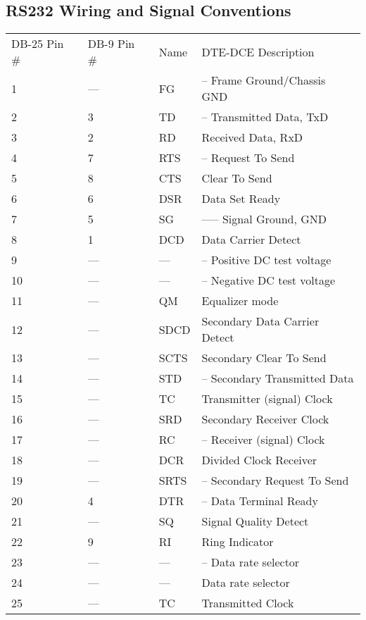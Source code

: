 \label{RS232-Wiring-and-Signal-Conventions}

\subsection*{RS232 Wiring and Signal Conventions}

\label{index-Cables-216}

\begin{longtable}{llll}
{DB-25 Pin \#} & {DB-9 Pin \#} & {Name} & {DTE-DCE Description 
 } \\
{1} & {{---}} & {FG} & {{--} Frame Ground/Chassis GND 
 } \\
{2} & {3} & {TD} & {{--}\gt{} Transmitted Data, TxD 
 } \\
{3} & {2} & {RD} & {\lt{}{--} Received Data, RxD 
 } \\
{4} & {7} & {RTS} & {{--}\gt{} Request To Send 
 } \\
{5} & {8} & {CTS} & {\lt{}{--} Clear To Send 
 } \\
{6} & {6} & {DSR} & {\lt{}{--} Data Set Ready 
 } \\
{7} & {5} & {SG} & {{--}{---} Signal Ground, GND 
 } \\
{8} & {1} & {DCD} & {\lt{}{--} Data Carrier Detect 
 } \\
{9} & {{---}} & {{---}} & {{--} Positive DC test voltage 
 } \\
{10} & {{---}} & {{---}} & {{--} Negative DC test voltage 
 } \\
{11} & {{---}} & {QM} & {\lt{}{--} Equalizer mode 
 } \\
{12} & {{---}} & {SDCD} & {\lt{}{--} Secondary Data Carrier Detect 
 } \\
{13} & {{---}} & {SCTS} & {\lt{}{--} Secondary Clear To Send 
 } \\
{14} & {{---}} & {STD} & {{--}\gt{} Secondary Transmitted Data 
 } \\
{15} & {{---}} & {TC} & {\lt{}{--} Transmitter (signal) Clock 
 } \\
{16} & {{---}} & {SRD} & {\lt{}{--} Secondary Receiver Clock 
 } \\
{17} & {{---}} & {RC} & {{--}\gt{} Receiver (signal) Clock 
 } \\
{18} & {{---}} & {DCR} & {\lt{}{--} Divided Clock Receiver 
 } \\
{19} & {{---}} & {SRTS} & {{--}\gt{} Secondary Request To Send 
 } \\
{20} & {4} & {DTR} & {{--}\gt{} Data Terminal Ready 
 } \\
{21} & {{---}} & {SQ} & {\lt{}{--} Signal Quality Detect 
 } \\
{22} & {9} & {RI} & {\lt{}{--} Ring Indicator 
 } \\
{23} & {{---}} & {{---}} & {{--}\gt{} Data rate selector 
 } \\
{24} & {{---}} & {{---}} & {\lt{}{--} Data rate selector 
 } \\
{25} & {{---}} & {TC} & {\lt{}{--} Transmitted Clock  
}


\end{longtable}
